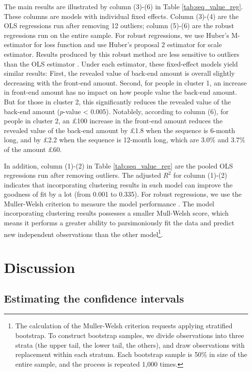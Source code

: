 \documentclass[
  12pt,
]{article}
\begin{document}
The main results are illustrated by column (3)-(6) in Table
\ref{tab:seq_value_reg}. These columns are models with individual fixed
effects. Column (3)-(4) are the OLS regressions run after removing 12
outliers; column (5)-(6) are the robust regressions run on the entire
sample. For robust regressions, we use Huber's M-estimator for loss
function and use Huber's proposal 2 estimator for scale estimator.
Results produced by this robust method are less sensitive to outliers
than the OLS estimator \citep{huber2009robust}. Under each estimator,
these fixed-effect models yield similar results: First, the revealed
value of back-end amount is overall slightly decreasing with the
front-end amount. Second, for people in cluster 1, an increase in
front-end amount has no impact on how people value the back-end amount.
But for those in cluster 2, this significantly reduces the revealed
value of the back-end amount (\(p\)-value \textless{} 0.005). Notablely,
according to column (6), for people in cluster 2, an £100 increase in
the front-end amount reduces the revealed value of the back-end amount
by £1.8 when the sequence is 6-month long, and by £2.2 when the sequence
is 12-month long, which are 3.0\% and 3.7\% of the amount £60.

In addition, column (1)-(2) in Table \ref{tab:seq_value_reg} are the
pooled OLS regressions run after removing outliers. The adjusted \(R^2\)
for column (1)-(2) indicates that incorporating clustering results in
such model can improve the goodness of fit by a lot (from 0.001 to
0.335). For robust regressions, we use the Muller-Welsh criterion to
measure the model performance \citep{muller2005outlier}. The model
incorporating clustering results possesses a smaller Mull-Welsh score,
which means it performs a greater ability to parsimoniously fit the data
and predict new independent observations than the other
model\footnote{The calculation of the Muller-Welsh criterion requests
  applying stratified bootstrap. To construct bootstrap samples, we
  divide observations into three strata (the upper tail, the lower tail,
  the others), and draw observations with replacement within each
  stratum. Each bootstrap sample is 50\% in size of the entire sample,
  and the process is repeated 1,000 times.}.

\hypertarget{discussion}{%
\section{Discussion}\label{discussion}}

\hypertarget{estimating-the-confidence-intervals}{%
\subsection{Estimating the confidence
intervals}\label{estimating-the-confidence-intervals}}
\end{document}
